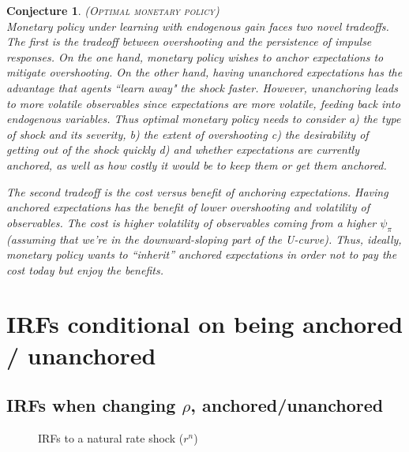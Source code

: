 \documentclass[11pt]{article}
\def \myFigPath {../figures/}
\renewcommand{\[}{\begin{equation}}
\renewcommand{\]}{\end{equation}}
\newtheorem{conjecture}{Conjecture}
\def\mySmallerFigScale{0.18}
\begin{document}
	\begin{conjecture} \textsc{(Optimal monetary policy)} \\
	Monetary policy under learning with endogenous gain faces two novel tradeoffs. The first is the tradeoff between overshooting and the persistence of impulse responses. On the one hand, monetary policy wishes to anchor expectations to mitigate overshooting. On the other hand, having unanchored expectations has the advantage that agents ``learn away" the shock faster. However, unanchoring leads to more volatile observables since expectations are more volatile, feeding back into endogenous variables. Thus optimal monetary policy needs to consider a) the type of shock and its severity, b) the extent of overshooting c) the desirability of getting out of the shock quickly d) and whether expectations are currently anchored, as well as how costly it would be to keep them or get them anchored. 
	
	The second tradeoff is the cost versus benefit of anchoring expectations. Having anchored expectations has the benefit of lower overshooting and volatility of observables. The cost is higher volatility of observables coming from a higher $\psi_{\pi}$ (assuming that we're in the downward-sloping part of the U-curve). Thus, ideally, monetary policy wants to ``inherit'' anchored expectations in order not to pay the cost today but enjoy the benefits.

	\end{conjecture}


\section{IRFs conditional on being anchored / unanchored}

\subsection{IRFs when changing $\rho$, anchored/unanchored}
\vspace{-0.5cm}
\begin{figure}[h!]
\caption{IRFs to a natural rate shock ($r^n$)}
\end{figure}
\end{document}
